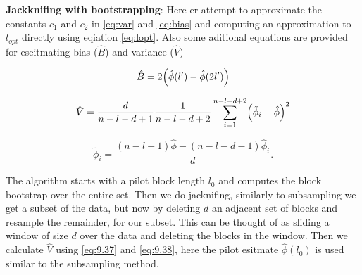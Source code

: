 \documentclass[a4paper,12pt]{article}
\theoremstyle{breaktheorem}
\theoremstyle{exerciseStyle}
\theoremstyle{solutionStyle}
\begin{document}
\begin{enumerate}
          \textbf{Jackknifing with bootstrapping}:
          Here er attempt to approximate the constants $c_1$ and $c_2$ in \eqref{eq:var} and \eqref{eq:bias} and computing an approximation to
          $l_{opt}$ directly using eqiation \eqref{eq:lopt}. Also some aditional equations are provided for eseitmating bias ($\hat B$) and variance ($\hat V$)

          \begin{equation} \label{eq:9.36}
              \hat{B} = 2\Bigl(\hat{\phi}(l') - \hat{\phi}(2l')\Bigr)
          \end{equation}

          \begin{equation} \label{eq:9.37}
              \hat{V} = \frac{d}{n - l - d + 1} \frac{1}{n - l - d + 2} \sum_{i=1}^{n - l - d + 2} \Bigl(\tilde{\phi}_i - \hat{\phi}\Bigr)^2
          \end{equation}

          \begin{equation} \label{eq:9.38}
              \tilde{\phi}_i = \frac{(n - l + 1)\hat{\phi} - (n - l - d - 1)\hat{\phi}_i}{d}.
          \end{equation}


          The algorithm starts with a pilot block length $l_0$ and computes the block bootstrap over the entire set.
          Then we do jacknifing, similarly to subsampling we get a subset of the data, but now by deleting $d$ an adjacent set of blocks
          and resample the remainder, for our subset. This can be thought of as sliding a window of size $d$ over the data and deleting
          the blocks in the window.
          Then we calculate $\hat{V}$ using \eqref{eq:9.37} and \eqref{eq:9.38}, here the pilot esitmate $\hat{\phi} (l_0)$ is used
          similar to the subsampling method.




\end{enumerate}
\end{document}
